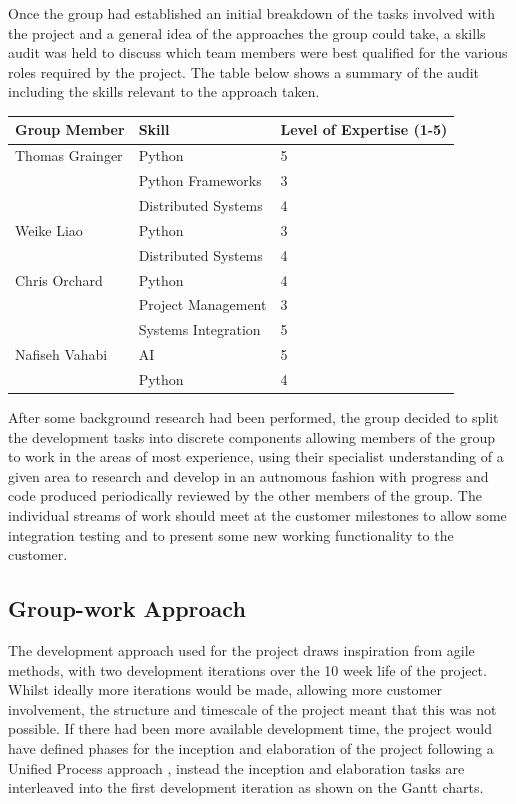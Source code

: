 Once the group had established an initial breakdown of the tasks involved with the
project and a general idea of the approaches the group could take,
 a skills audit was held to discuss which team members were best
qualified for the various roles required by the project. The table below shows
a summary of the audit including the skills relevant to the approach taken.

\begin{center}
\begin{tabularx}{\linewidth}{|XXX|}
\hline
Group Member & Skill & Level of Expertise (1-5) \\ \hline
Thomas Grainger & Python & 5 \\
& Python Frameworks & 3 \\
& Distributed Systems & 4 \\ \hline
Weike Liao & Python & 3 \\
& Distributed Systems & 4 \\ \hline
Chris Orchard & Python & 4 \\
& Project Management & 3 \\
& Systems Integration & 5 \\ \hline
Nafiseh Vahabi & AI & 5 \\
& Python & 4 \\
\hline
\end{tabularx}
\end{center}

After some background research had been performed, the group decided to split
the development tasks into discrete components allowing members of the group to
work in the areas of most experience, using their specialist understanding of a
given area to research and develop in an autnomous fashion with progress and
code produced periodically reviewed by the other members of the group. The
individual streams of work should meet at the customer milestones to allow some
integration testing and to present some new working functionality to the
customer.

\subsection{Group-work Approach}
The development approach used for the project draws inspiration from agile
methods, with two
development iterations over the 10 week life of the project. Whilst ideally more
iterations would be made, allowing more customer involvement, the
structure and timescale of the project meant that this was not possible. If
there had been more available development time, the project would have defined
phases for the inception and elaboration of the project following a Unified
Process approach \cite{jacobson1999unified}, instead the inception and elaboration tasks are
interleaved into the first development iteration as shown on the Gantt charts. 

